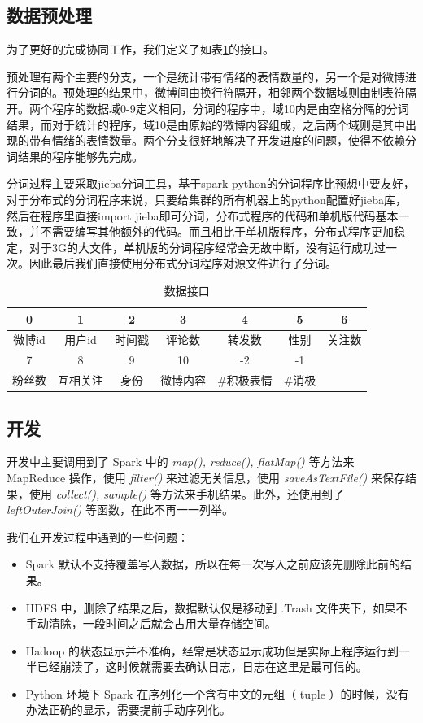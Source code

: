 \documentclass[12pt, oneside]{article}
\begin{document}
\begin{spacing}{1.5}
\begin{CJK}{UTF8}{gbsn}
\subsection{数据预处理}
为了更好的完成协同工作，我们定义了如表\ref{tbl:interface}的接口。

预处理有两个主要的分支，一个是统计带有情绪的表情数量的，另一个是对微博进行分词的。预处理的结果中，微博间由换行符隔开，相邻两个数据域则由制表符隔开。两个程序的数据域0-9定义相同，分词的程序中，域10内是由空格分隔的分词结果，而对于统计的程序，域10是由原始的微博内容组成，之后两个域则是其中出现的带有情绪的表情数量。两个分支很好地解决了开发进度的问题，使得不依赖分词结果的程序能够先完成。

分词过程主要采取jieba分词工具，基于spark python的分词程序比预想中要友好，对于分布式的分词程序来说，只要给集群的所有机器上的python配置好jieba库，然后在程序里直接import jieba即可分词，分布式程序的代码和单机版代码基本一致，并不需要编写其他额外的代码。而且相比于单机版程序，分布式程序更加稳定，对于3G的大文件，单机版的分词程序经常会无故中断，没有运行成功过一次。因此最后我们直接使用分布式分词程序对源文件进行了分词。


\begin{table}[]
\centering
\begin{tabular}{|c|c|c|c|c|c|c|}
\hline
0    & 1    & 2   & 3    & 4      & 5    & 6   \\ \hline
微博id & 用户id & 时间戳 & 评论数  & 转发数    & 性别   & 关注数 \\ \hline
7    & 8    & 9   & 10   & -2     & -1   &     \\ \hline
粉丝数  & 互相关注 & 身份  & 微博内容 & \#积极表情 & \#消极 &     \\ \hline
\end{tabular}
\caption{数据接口}
\label{tbl:interface}
\end{table}

\subsection{开发}
开发中主要调用到了 Spark 中的 {\it map(), reduce(), flatMap()} 等方法来 MapReduce 操作，使用 {\it filter()} 来过滤无关信息，使用 {\it saveAsTextFile()} 来保存结果，使用 {\it collect(), sample()} 等方法来手机结果。此外，还使用到了 {\it leftOuterJoin()} 等函数，在此不再一一列举。

我们在开发过程中遇到的一些问题：
\begin{itemize}
	\item Spark 默认不支持覆盖写入数据，所以在每一次写入之前应该先删除此前的结果。
	\item HDFS 中，删除了结果之后，数据默认仅是移动到 .Trash 文件夹下，如果不手动清除，一段时间之后就会占用大量存储空间。
	\item Hadoop 的状态显示并不准确，经常是状态显示成功但是实际上程序运行到一半已经崩溃了，这时候就需要去确认日志，日志在这里是最可信的。
	\item Python 环境下 Spark 在序列化一个含有中文的元组（ tuple ）的时候，没有办法正确的显示，需要提前手动序列化。
\end{itemize}


\end{CJK}
\end{spacing}
\end{document}
